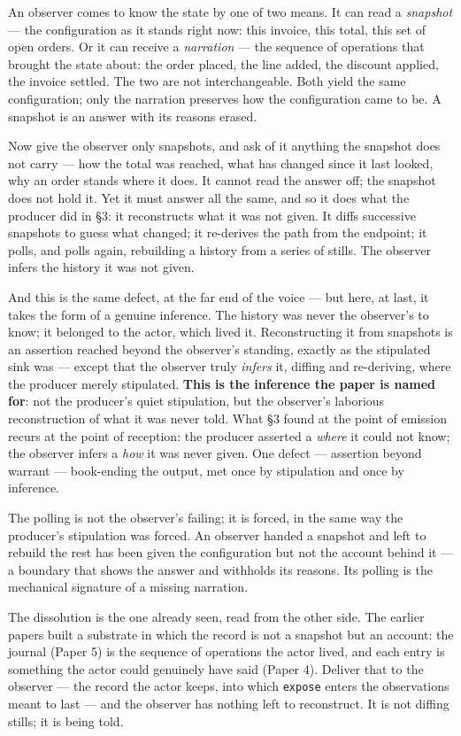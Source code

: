 \documentclass[
]{article}
\begin{document}
An observer comes to know the state by one of two means. It can read a
\emph{snapshot} --- the configuration as it stands right now: this
invoice, this total, this set of open orders. Or it can receive a
\emph{narration} --- the sequence of operations that brought the state
about: the order placed, the line added, the discount applied, the
invoice settled. The two are not interchangeable. Both yield the same
configuration; only the narration preserves how the configuration came
to be. A snapshot is an answer with its reasons erased.

Now give the observer only snapshots, and ask of it anything the
snapshot does not carry --- how the total was reached, what has changed
since it last looked, why an order stands where it does. It cannot read
the answer off; the snapshot does not hold it. Yet it must answer all
the same, and so it does what the producer did in §3: it reconstructs
what it was not given. It diffs successive snapshots to guess what
changed; it re-derives the path from the endpoint; it polls, and polls
again, rebuilding a history from a series of stills. The observer infers
the history it was not given.

And this is the same defect, at the far end of the voice --- but here,
at last, it takes the form of a genuine inference. The history was never
the observer's to know; it belonged to the actor, which lived it.
Reconstructing it from snapshots is an assertion reached beyond the
observer's standing, exactly as the stipulated sink was --- except that
the observer truly \emph{infers} it, diffing and re-deriving, where the
producer merely stipulated. \textbf{This is the inference the paper is
named for}: not the producer's quiet stipulation, but the observer's
laborious reconstruction of what it was never told. What §3 found at the
point of emission recurs at the point of reception: the producer
asserted a \emph{where} it could not know; the observer infers a
\emph{how} it was never given. One defect --- assertion beyond warrant
--- book-ending the output, met once by stipulation and once by
inference.

The polling is not the observer's failing; it is forced, in the same way
the producer's stipulation was forced. An observer handed a snapshot and
left to rebuild the rest has been given the configuration but not the
account behind it --- a boundary that shows the answer and withholds its
reasons. Its polling is the mechanical signature of a missing narration.

The dissolution is the one already seen, read from the other side. The
earlier papers built a substrate in which the record is not a snapshot
but an account: the journal (Paper 5) is the sequence of operations the
actor lived, and each entry is something the actor could genuinely have
said (Paper 4). Deliver that to the observer --- the record the actor
keeps, into which \texttt{expose} enters the observations meant to last
--- and the observer has nothing left to reconstruct. It is not diffing
stills; it is being told.
\end{document}
